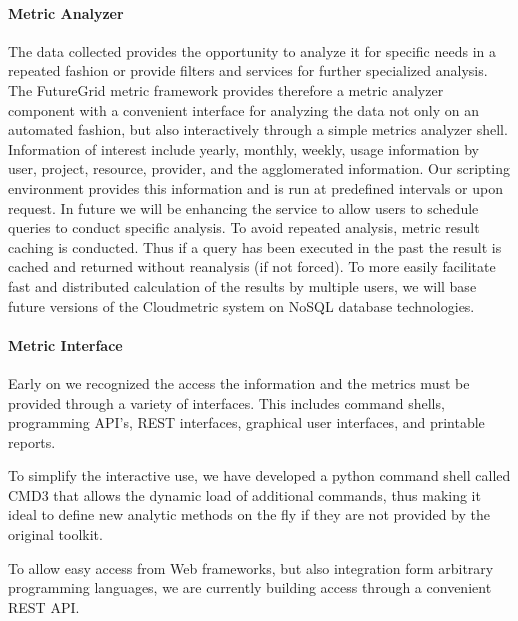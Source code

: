 \documentclass{tex/sig-alternate-2013}
\newcommand{\todo}[1]{{\color{red}{#1}}}
\begin{document}
{\paragraph{Metric Analyzer}


\todo{READ}

The data collected provides the opportunity to analyze it for specific needs in a repeated fashion or provide filters and services for further specialized analysis. The FutureGrid metric framework provides therefore a metric analyzer component with a convenient interface for analyzing the data not only on an automated fashion, but also interactively through a simple metrics analyzer shell. Information of interest include yearly, monthly, weekly, usage information by user, project, resource, provider, and the agglomerated information. Our scripting environment provides this information and is run at predefined intervals or upon request. In future we will be enhancing the service to allow users to schedule queries to conduct specific analysis. To avoid repeated analysis, metric result caching is conducted. Thus if a query has been executed in the past the result is cached and returned without reanalysis (if not forced). To more easily facilitate fast and distributed calculation of the results by multiple users, we will base future versions of the Cloudmetric system on NoSQL database technologies.

\paragraph{Metric Interface}


\todo{READ}

Early on we recognized the access the information and the metrics must be provided through a variety of interfaces. This includes command shells, programming API's, REST interfaces, graphical user interfaces, and printable reports.

\begin{description}[leftmargin=*,itemsep=0pt,topsep=0pt]

\item[Interactive Command Shell.] To simplify the interactive use, we have developed a python command shell called CMD3 that allows the dynamic load of additional commands, thus making it ideal to define new analytic methods on the fly if they are not provided by the original toolkit.

\item[REST API.] To allow easy access from Web frameworks, but also integration form arbitrary programming languages, we are currently building access through a convenient REST API.


\end{description}}
\end{document}

